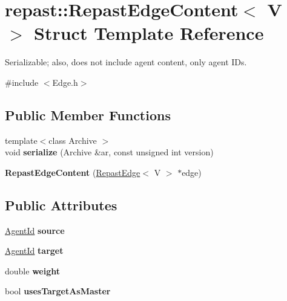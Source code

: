 \hypertarget{structrepast_1_1_repast_edge_content}{\section{repast\-:\-:Repast\-Edge\-Content$<$ V $>$ Struct Template Reference}
\label{structrepast_1_1_repast_edge_content}
}


Serializable; also, does not include agent content, only agent I\-Ds.  




{\ttfamily \#include $<$Edge.\-h$>$}

\subsection*{Public Member Functions}
\begin{DoxyCompactItemize}
\item 
\hypertarget{structrepast_1_1_repast_edge_content_acf1dd5e3c6f91f7b4097e03a8e5795fd}{{\footnotesize template$<$class Archive $>$ }\\void {\bfseries serialize} (Archive \&ar, const unsigned int version)}\label{structrepast_1_1_repast_edge_content_acf1dd5e3c6f91f7b4097e03a8e5795fd}

\item 
\hypertarget{structrepast_1_1_repast_edge_content_a41c8b5f825c6fae38205d922b837436c}{{\bfseries Repast\-Edge\-Content} (\hyperlink{classrepast_1_1_repast_edge}{Repast\-Edge}$<$ V $>$ $\ast$edge)}\label{structrepast_1_1_repast_edge_content_a41c8b5f825c6fae38205d922b837436c}

\end{DoxyCompactItemize}
\subsection*{Public Attributes}
\begin{DoxyCompactItemize}
\item 
\hypertarget{structrepast_1_1_repast_edge_content_a316904c57748bf3d3f7b3551f6563e62}{\hyperlink{classrepast_1_1_agent_id}{Agent\-Id} {\bfseries source}}\label{structrepast_1_1_repast_edge_content_a316904c57748bf3d3f7b3551f6563e62}

\item 
\hypertarget{structrepast_1_1_repast_edge_content_a8ab68f31229fb54eeccce3e218c4d616}{\hyperlink{classrepast_1_1_agent_id}{Agent\-Id} {\bfseries target}}\label{structrepast_1_1_repast_edge_content_a8ab68f31229fb54eeccce3e218c4d616}

\item 
\hypertarget{structrepast_1_1_repast_edge_content_a7b215d788a566b8d0c2ec536ff7f638f}{double {\bfseries weight}}\label{structrepast_1_1_repast_edge_content_a7b215d788a566b8d0c2ec536ff7f638f}

\item 
\hypertarget{structrepast_1_1_repast_edge_content_ab29b612bef3746d1938a8ad94e60b056}{bool {\bfseries uses\-Target\-As\-Master}}\label{structrepast_1_1_repast_edge_content_ab29b612bef3746d1938a8ad94e60b056}

\end{DoxyCompactItemize}
